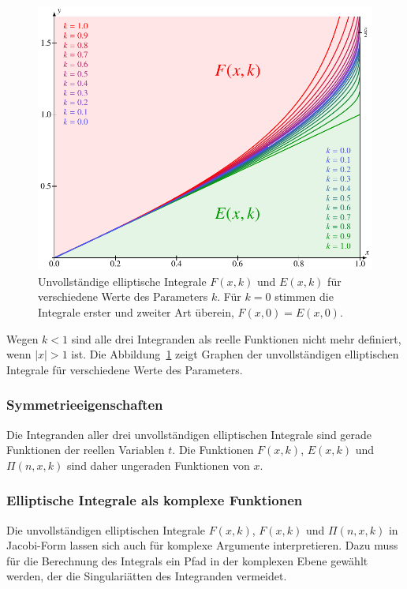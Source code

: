 \begin{figure}
\centering
\includegraphics{chapters/110-elliptisch/images/unvollstaendig.pdf}
\caption{Unvollständige elliptische Integrale $F(x,k)$ und $E(x,k)$
für verschiedene Werte des Parameters $k$.
Für $k=0$ stimmen die Integrale erster und zweiter Art überein,
$F(x,0)=E(x,0)$.
\label{buch:elliptisch:fig:unvollstaendigeintegrale}}
\end{figure}
Wegen $k<1$ sind alle drei Integranden als reelle Funktionen nicht
mehr definiert, wenn $|x|>1$ ist.
Die Abbildung~\ref{buch:elliptisch:fig:unvollstaendigeintegrale}
zeigt Graphen der unvollständigen elliptischen Integrale für verschiedene
Werte des Parameters.

\subsubsection{Symmetrieeigenschaften}
Die Integranden aller drei unvollständigen elliptischen Integrale
sind gerade Funktionen der reellen Variablen $t$.
Die Funktionen $F(x,k)$, $E(x,k)$ und $\Pi(n,x,k)$ sind daher
ungeraden Funktionen von $x$.

\subsubsection{Elliptische Integrale als komplexe Funktionen}
Die unvollständigen elliptischen Integrale $F(x,k)$, $F(x,k)$ und $\Pi(n,x,k)$
in Jacobi-Form lassen sich auch für komplexe Argumente interpretieren.
Dazu muss für die Berechnung des Integrals ein Pfad in der komplexen
Ebene gewählt werden, der die Singulariätten des Integranden vermeidet.

